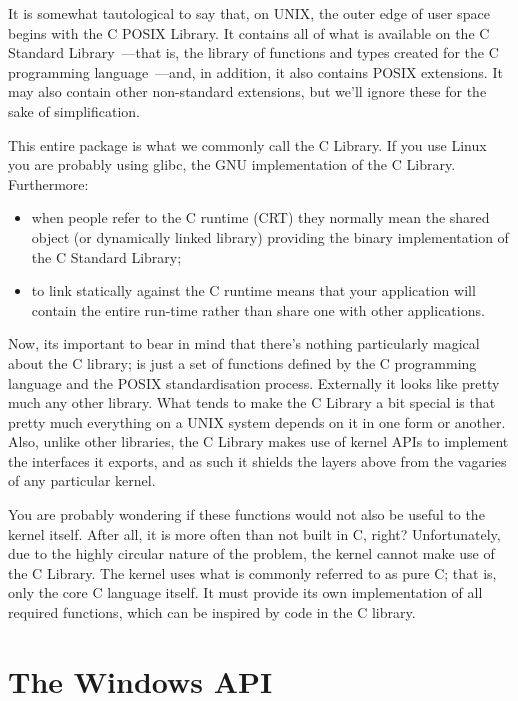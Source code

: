 \documentclass{book}
\begin{document}
It is somewhat tautological to say that, on UNIX, the outer edge of
user space begins with the C POSIX Library. It contains all of what is
available on the C Standard Library~---that is, the library of
functions and types created for the C programming language~---and, in
addition, it also contains POSIX extensions. It may also contain other
non-standard extensions, but we'll ignore these for the sake of
simplification.

This entire package is what we commonly call the C Library. If you use
Linux you are probably using glibc, the GNU implementation of the C
Library. Furthermore:

\begin{itemize}
\item when people refer to the C runtime (CRT) they normally mean the
  shared object (or dynamically linked library) providing the binary
  implementation of the C Standard Library;
\item to link statically against the C runtime means that your
  application will contain the entire run-time rather than share one
  with other applications.
\end{itemize}

Now, its important to bear in mind that there's nothing particularly
magical about the C library; is just a set of functions defined by the
C programming language and the POSIX standardisation
process. Externally it looks like pretty much any other library. What
tends to make the C Library a bit special is that pretty much
everything on a UNIX system depends on it in one form or
another. Also, unlike other libraries, the C Library makes use of
kernel APIs to implement the interfaces it exports, and as such it
shields the layers above from the vagaries of any particular kernel.

You are probably wondering if these functions would not also be useful
to the kernel itself. After all, it is more often than not built in C,
right? Unfortunately, due to the highly circular nature of the
problem, the kernel cannot make use of the C Library. The kernel uses
what is commonly referred to as pure C; that is, only the core C
language itself. It must provide its own implementation of all
required functions, which can be inspired by code in the C library.

\section{The Windows API}
\end{document}
